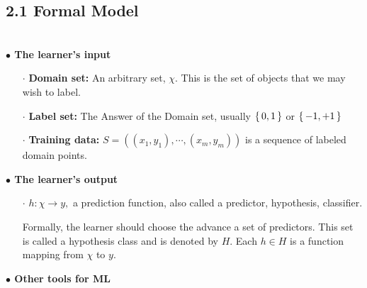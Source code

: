 \subsection*{2.1 Formal Model} $ $\\

\textbf{$\bullet$ The learner's input}
	\begin{enumerate}
		\item[$\cdot$] \textbf{Domain set:} An arbitrary set, $\chi$. This is the set of objects that we may wish to label.
		\item[$\cdot$] \textbf{Label set:} The Answer of the Domain set, usually $\left\{ \,0,1 \,\right\}$ or $\left\{ \,-1,+1 \,\right\}$
		\item[$\cdot$] \textbf{Training data:} $S = ((x_1,y_1),\cdots,(x_m,y_m))$ is a sequence of labeled domain points.
	\end{enumerate}


\textbf{$\bullet$ The learner's output}
\begin{enumerate}
	\item[$\cdot$] $h:\chi \rightarrow y,$ a prediction function, also called a predictor, hypothesis, classifier.
	
	Formally, the learner should choose the advance a set of predictors. This set is called a hypothesis class and is denoted by $H$. Each $h \in H$ is a function mapping from $\chi$ to $y$.
\end{enumerate}


\textbf{$\bullet$ Other tools for ML}

